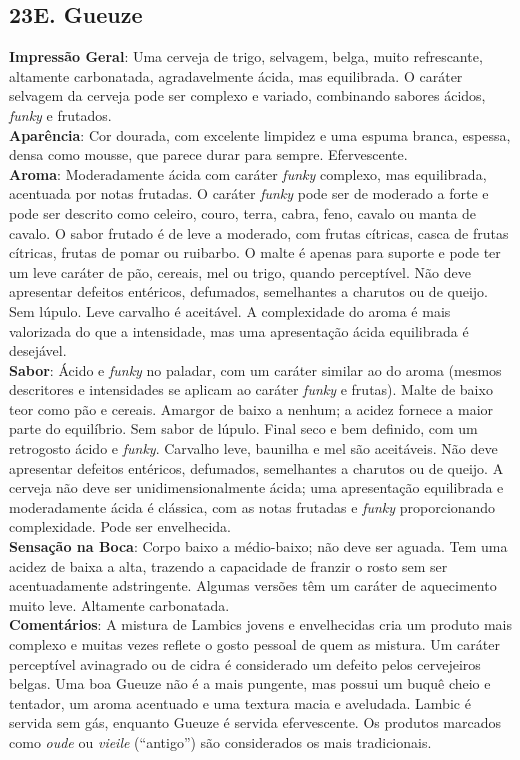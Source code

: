 \subsection*{23E. Gueuze}
\textbf{Impressão Geral}: Uma cerveja de trigo, selvagem, belga, muito refrescante, altamente carbonatada, agradavelmente ácida, mas equilibrada. O caráter selvagem da cerveja pode ser complexo e variado, combinando sabores ácidos, \textit{funky} e frutados. \\
\textbf{Aparência}: Cor dourada, com excelente limpidez e uma espuma branca, espessa, densa como mousse, que parece durar para sempre. Efervescente. \\
\textbf{Aroma}: Moderadamente ácida com caráter \textit{funky} complexo, mas equilibrada, acentuada por notas frutadas. O caráter \textit{funky} pode ser de moderado a forte e pode ser descrito como celeiro, couro, terra, cabra, feno, cavalo ou manta de cavalo. O sabor frutado é de leve a moderado, com frutas cítricas, casca de frutas cítricas, frutas de pomar ou ruibarbo. O malte é apenas para suporte e pode ter um leve caráter de pão, cereais, mel ou trigo, quando perceptível. Não deve apresentar defeitos entéricos, defumados, semelhantes a charutos ou de queijo. Sem lúpulo. Leve carvalho é aceitável. A complexidade do aroma é mais valorizada do que a intensidade, mas uma apresentação ácida equilibrada é desejável. \\
\textbf{Sabor}: Ácido e \textit{funky} no paladar, com um caráter similar ao do aroma (mesmos descritores e intensidades se aplicam ao caráter \textit{funky} e frutas). Malte de baixo teor como pão e cereais. Amargor de baixo a nenhum; a acidez fornece a maior parte do equilíbrio. Sem sabor de lúpulo. Final seco e bem definido, com um retrogosto ácido e \textit{funky}. Carvalho leve, baunilha e mel são aceitáveis. Não deve apresentar defeitos entéricos, defumados, semelhantes a charutos ou de queijo. A cerveja não deve ser unidimensionalmente ácida; uma apresentação equilibrada e moderadamente ácida é clássica, com as notas frutadas e \textit{funky} proporcionando complexidade. Pode ser envelhecida. \\
\textbf{Sensação na Boca}: Corpo baixo a médio-baixo; não deve ser aguada. Tem uma acidez de baixa a alta, trazendo a capacidade de franzir o rosto sem ser acentuadamente adstringente. Algumas versões têm um caráter de aquecimento muito leve. Altamente carbonatada. \\
\textbf{Comentários}: A mistura de Lambics jovens e envelhecidas cria um produto mais complexo e muitas vezes reflete o gosto pessoal de quem as mistura. Um caráter perceptível avinagrado ou de cidra é considerado um defeito pelos cervejeiros belgas. Uma boa Gueuze não é a mais pungente, mas possui um buquê cheio e tentador, um aroma acentuado e uma textura macia e aveludada. Lambic é servida sem gás, enquanto Gueuze é servida efervescente. Os produtos marcados como \textit{oude} ou \textit{vieile} (“antigo”) são considerados os mais tradicionais. \\

